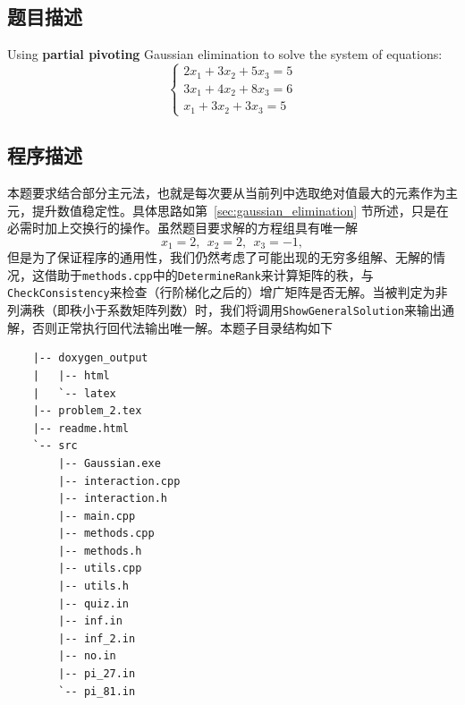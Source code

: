 \subsection{题目描述}
Using \textbf{partial pivoting} Gaussian elimination to solve the system of equations:
\[
	\begin{cases}
		2x_1 + 3x_2 + 5x_3 = 5 \\
		3x_1 + 4x_2 + 8x_3 = 6 \\
		x_1 + 3x_2 + 3x_3 = 5
	\end{cases}
\]

\subsection{程序描述}
本题要求结合部分主元法，也就是每次要从当前列中选取绝对值最大的元素作为主元，提升数值稳定性。具体思路如第\ \ref{sec:gaussian_elimination} 节所述，只是在必需时加上交换行的操作。虽然题目要求解的方程组具有唯一解
\[
	x_1 = 2, \ \  x_2 = 2,  \ \   x_3 = -1,
\]
但是为了保证程序的通用性，我们仍然考虑了可能出现的无穷多组解、无解的情况，这借助于\texttt{methods.cpp}中的\texttt{DetermineRank}来计算矩阵的秩，与\texttt{CheckConsistency}来检查（行阶梯化之后的）增广矩阵是否无解。当被判定为非列满秩（即秩小于系数矩阵列数）时，我们将调用\texttt{ShowGeneralSolution}来输出通解，否则正常执行回代法输出唯一解。本题子目录结构如下
\begin{multicols}{2}
	\begin{verbatim}
    |-- doxygen_output
    |   |-- html
    |   `-- latex
    |-- problem_2.tex
    |-- readme.html
    `-- src
        |-- Gaussian.exe
        |-- interaction.cpp
        |-- interaction.h
        |-- main.cpp
        |-- methods.cpp
        |-- methods.h
        |-- utils.cpp
        |-- utils.h
        |-- quiz.in
        |-- inf.in
        |-- inf_2.in
        |-- no.in
        |-- pi_27.in
        `-- pi_81.in
    \end{verbatim}
\end{multicols}
